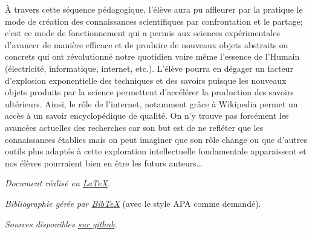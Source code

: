 \documentclass[11pt,bibliography=totoc]{scrartcl}
\begin{document}
À travers cette séquence pédagogique, l'élève aura pu affleurer par la pratique
le mode de création des connaissances scientifiques par confrontation et
le partage; c'est ce mode de fonctionnement qui a permis aux sciences
expérimentales d'avancer de manière efficace et de produire de nouveaux objets
abstraits ou concrets qui ont révolutionné notre quotidien voire même l'essence
de l'Humain (électricité, informatique, internet, etc.). L'élève pourra en
dégager un facteur d'explosion exponentielle des techniques et des savoirs
puisque les nouveaux objets produits par la science permettent d'accélérer la
production des savoirs ultérieurs. Ainsi, le rôle de l'internet, notamment grâce
à Wikipedia permet un accès à un savoir encyclopédique de qualité. On n'y trouve
pas forcément les avancées actuelles des recherches car son but est de ne
refléter que les connaissances établies mais on peut imaginer que son rôle
change ou que d'autres outils plus adaptés à cette exploration intellectuelle
fondamentale apparaissent et nos élèves pourraient bien en être les futurs
auteurs\ldots

\pagebreak
\printbibliography  %
\vfill
\emph{Document réalisé en \href{https://www.latex-project.org/}{\LaTeX}.}\par
\emph{Bibliographie gérée par \href{http://www.bibtex.org/}{Bib\TeX}} {\small
(avec le style APA comme demandé).}\par
\emph{Sources disponibles \href{https://github.com/Dalker/didac_010}{sur
    github}.}

\end{document}
